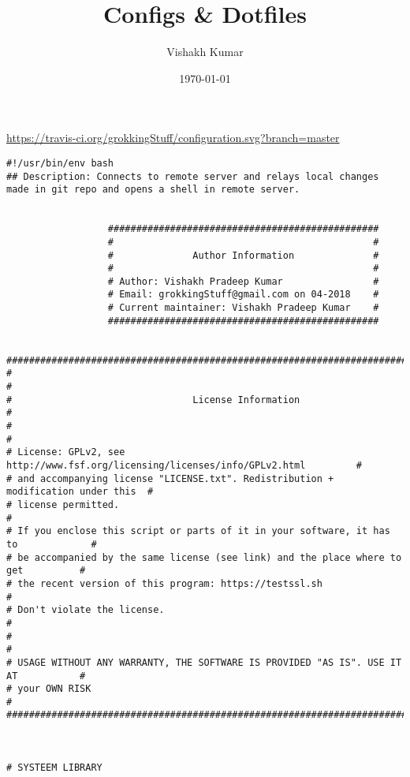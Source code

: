 \documentclass[11pt]{article}
\author{Vishakh Kumar}
\date{\today}
\title{Configs \& Dotfiles}
\begin{document}
\maketitle
\setcounter{tocdepth}{4}
\tableofcontents

\url{https://travis-ci.org/grokkingStuff/configuration.svg?branch=master}

\begin{verbatim}
#!/usr/bin/env bash
## Description: Connects to remote server and relays local changes made in git repo and opens a shell in remote server.


                  ################################################
                  #                                              #
                  #              Author Information              #
                  #                                              #
                  # Author: Vishakh Pradeep Kumar                #
                  # Email: grokkingStuff@gmail.com on 04-2018    #
                  # Current maintainer: Vishakh Pradeep Kumar    #
                  ################################################


#####################################################################################
#                                                                                   #
#                                License Information                                #
#                                                                                   #
# License: GPLv2, see http://www.fsf.org/licensing/licenses/info/GPLv2.html         #
# and accompanying license "LICENSE.txt". Redistribution + modification under this  #
# license permitted.                                                                #
# If you enclose this script or parts of it in your software, it has to             #
# be accompanied by the same license (see link) and the place where to get          #
# the recent version of this program: https://testssl.sh                            #
# Don't violate the license.                                                        #
#                                                                                   #
# USAGE WITHOUT ANY WARRANTY, THE SOFTWARE IS PROVIDED "AS IS". USE IT AT           #
# your OWN RISK                                                                     #
#####################################################################################



# SYSTEEM LIBRARY


\end{verbatim}
\end{document}
